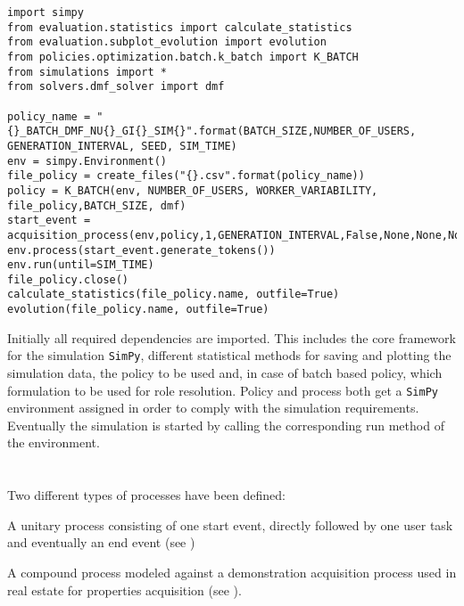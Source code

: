 \begin{lstlisting}[caption={Structure example of simulation framework using a K-Batch policy with \gls{dmf}. Initially dependencies are imported. Afterwards the discrete event simulation environment, a policy file for storing statistical data, a policy and a process returning its start event are initialized. Finally, by calling the environment's run method the simulation is started.},label=lst:simulation_script,style=CustomPython]
import simpy
from evaluation.statistics import calculate_statistics
from evaluation.subplot_evolution import evolution
from policies.optimization.batch.k_batch import K_BATCH
from simulations import *
from solvers.dmf_solver import dmf

policy_name = "{}_BATCH_DMF_NU{}_GI{}_SIM{}".format(BATCH_SIZE,NUMBER_OF_USERS, GENERATION_INTERVAL, SEED, SIM_TIME)
env = simpy.Environment()
file_policy = create_files("{}.csv".format(policy_name))
policy = K_BATCH(env, NUMBER_OF_USERS, WORKER_VARIABILITY, file_policy,BATCH_SIZE, dmf)
start_event = acquisition_process(env,policy,1,GENERATION_INTERVAL,False,None,None,None)
env.process(start_event.generate_tokens())
env.run(until=SIM_TIME)
file_policy.close()
calculate_statistics(file_policy.name, outfile=True)
evolution(file_policy.name, outfile=True)
\end{lstlisting}

Initially all required dependencies are imported. This includes the core framework for the simulation \texttt{SimPy}, different statistical methods for saving and plotting the simulation data, the policy to be used and, in case of batch based policy, which formulation to be used for role resolution. Policy and process both get a \texttt{SimPy} environment assigned in order to comply with the simulation requirements. Eventually the simulation is started by calling the corresponding run method of the environment.

\section{}

Two different types of processes have been defined:
\begin{enumerate*}
	\item A unitary process consisting of one start event, directly followed by one user task and eventually an end event (see )
	\item A compound process modeled against a demonstration acquisition process used in real estate for properties acquisition (see ).
\end{enumerate*}

